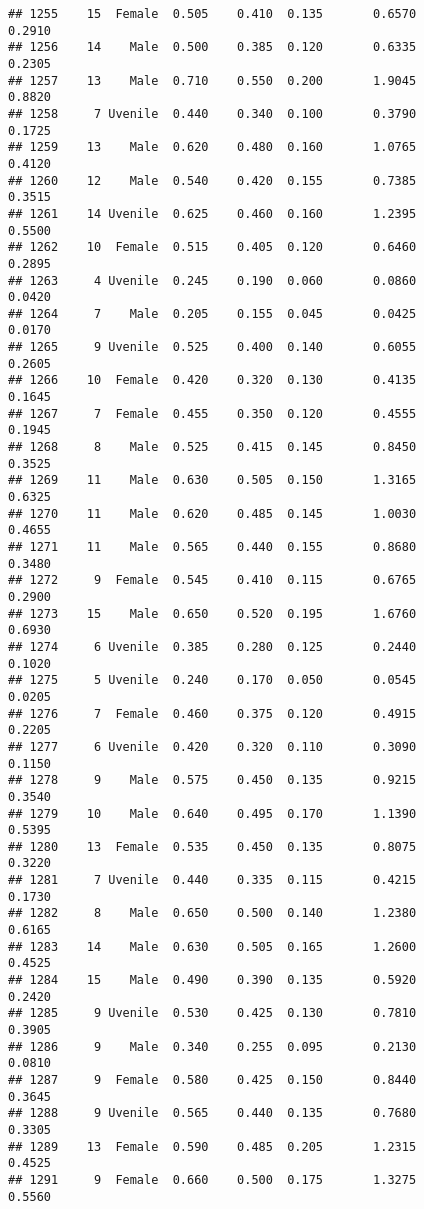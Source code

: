 \documentclass[
]{article}
\begin{document}
\begin{verbatim}
## 1255    15  Female  0.505    0.410  0.135       0.6570         0.2910
## 1256    14    Male  0.500    0.385  0.120       0.6335         0.2305
## 1257    13    Male  0.710    0.550  0.200       1.9045         0.8820
## 1258     7 Uvenile  0.440    0.340  0.100       0.3790         0.1725
## 1259    13    Male  0.620    0.480  0.160       1.0765         0.4120
## 1260    12    Male  0.540    0.420  0.155       0.7385         0.3515
## 1261    14 Uvenile  0.625    0.460  0.160       1.2395         0.5500
## 1262    10  Female  0.515    0.405  0.120       0.6460         0.2895
## 1263     4 Uvenile  0.245    0.190  0.060       0.0860         0.0420
## 1264     7    Male  0.205    0.155  0.045       0.0425         0.0170
## 1265     9 Uvenile  0.525    0.400  0.140       0.6055         0.2605
## 1266    10  Female  0.420    0.320  0.130       0.4135         0.1645
## 1267     7  Female  0.455    0.350  0.120       0.4555         0.1945
## 1268     8    Male  0.525    0.415  0.145       0.8450         0.3525
## 1269    11    Male  0.630    0.505  0.150       1.3165         0.6325
## 1270    11    Male  0.620    0.485  0.145       1.0030         0.4655
## 1271    11    Male  0.565    0.440  0.155       0.8680         0.3480
## 1272     9  Female  0.545    0.410  0.115       0.6765         0.2900
## 1273    15    Male  0.650    0.520  0.195       1.6760         0.6930
## 1274     6 Uvenile  0.385    0.280  0.125       0.2440         0.1020
## 1275     5 Uvenile  0.240    0.170  0.050       0.0545         0.0205
## 1276     7  Female  0.460    0.375  0.120       0.4915         0.2205
## 1277     6 Uvenile  0.420    0.320  0.110       0.3090         0.1150
## 1278     9    Male  0.575    0.450  0.135       0.9215         0.3540
## 1279    10    Male  0.640    0.495  0.170       1.1390         0.5395
## 1280    13  Female  0.535    0.450  0.135       0.8075         0.3220
## 1281     7 Uvenile  0.440    0.335  0.115       0.4215         0.1730
## 1282     8    Male  0.650    0.500  0.140       1.2380         0.6165
## 1283    14    Male  0.630    0.505  0.165       1.2600         0.4525
## 1284    15    Male  0.490    0.390  0.135       0.5920         0.2420
## 1285     9 Uvenile  0.530    0.425  0.130       0.7810         0.3905
## 1286     9    Male  0.340    0.255  0.095       0.2130         0.0810
## 1287     9  Female  0.580    0.425  0.150       0.8440         0.3645
## 1288     9 Uvenile  0.565    0.440  0.135       0.7680         0.3305
## 1289    13  Female  0.590    0.485  0.205       1.2315         0.4525
## 1291     9  Female  0.660    0.500  0.175       1.3275         0.5560

\end{verbatim}
\end{document}
